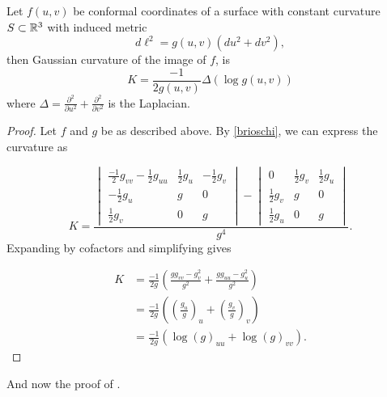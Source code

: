 \begin{theorem}\label{thm:liouville}
	Let $f(u,v)$ be conformal coordinates of a surface with constant curvature $S\subset \mathbb{R}^3$ with
	induced metric 
	$$d\ell^2=g(u,v)(du^2+dv^2),$$
	then Gaussian curvature of the image of $f$,  is 
		\begin{equation}\label{eqn:log-curve}
			K=\frac{-1}{2g(u,v)}\Delta(\log g(u,v))
		\end{equation}
		where $\Delta=\frac{\partial^2}{\partial u^2}+\frac{\partial^2}{\partial v^2}$
		is the Laplacian.
\end{theorem}
\begin{proof}
	Let $f$ and $g$ be as described above. 
	By \eqref{brioschi}, we can express the curvature as
	
	$$K=\frac{\begin{vmatrix}
\frac{-1}{2}g_{vv}-\frac{1}{2}g_{uu} & \frac{1}{2}g_u & -\frac{1}{2}g_v\\
-\frac{1}{2}g_u & g & 0\\
\frac{1}{2}g_v & 0 & g
\end{vmatrix}-\begin{vmatrix}
0 & \frac{1}{2}g_v & \frac{1}{2}g_u\\
\frac{1}{2}g_v & g & 0\\
\frac{1}{2}g_u & 0 & g
\end{vmatrix}}{g^4}.$$
Expanding by cofactors and simplifying gives

\begin{align}
	K&= \frac{-1}{2g}\left(\frac{gg_{vv}-g_v^2}{g^2}+\frac{gg_{uu}-g_u^2}{g^2}\right) \\
       &=\frac{-1}{2g}\left(\left(\frac{g_u}{g}\right)_u+\left(\frac{g_v}{g}\right)_v\right)\\
       &=\frac{-1}{2g}\left(\log(g)_{uu}+\log(g)_{vv}\right).
\end{align}


\end{proof}



And now the proof of .

